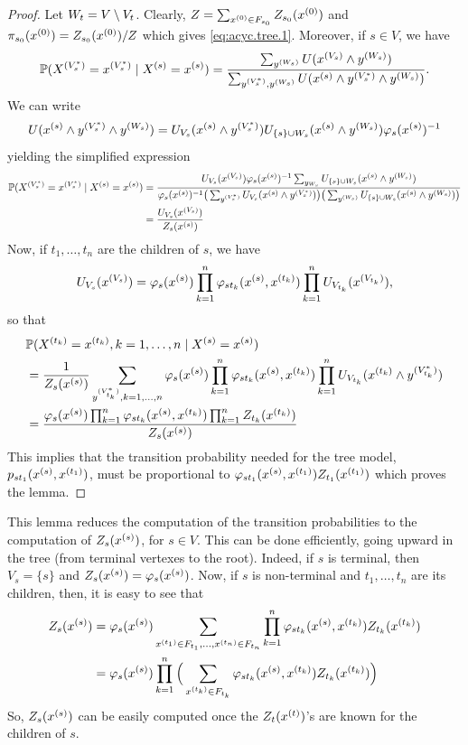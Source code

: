 \begin{proof}
Let  $W_t = V\setminus V_t$. 
Clearly, $Z = \sum_{x^{(0)}\in F_{s_0}} Z_{s_0} (x^{(0)})$
and $\pi_{s_0}(x^{(0)}) = Z_{s_0}(x^{(0)})/Z$ which gives \cref{eq:acyc.tree.1}. Moreover, if $s\in V$, we have
$$
\bm{\mathbb P}(X^{(V_s^*)} = x^{(V_s^*)}\mid X^{(s)}=x^{(s)}) = \frac{\sum_{y^{(W_s)}} U(x^{(V_s)}\wedge
y^{(W_s)})}{\sum_{y^{(V_s^*)}, y^{(W_s)}} U(x^{(s)}\wedge y^{(V_s^*)} \wedge
y^{(W_s)})}.
$$
We can write
$$
U(x^{(s)}\wedge y^{(V_s^*)} \wedge
y^{(W_s)}) = U_{V_s}(x^{(s)}\wedge y^{(V_s^*)}) U_{\{s\}\cup W_s}(x^{(s)}\wedge
y^{(W_s)}) \varphi_s(x^{(s)})^{-1}
$$
yielding the simplified expression
\begin{align*}
\bm{\mathbb P}(X^{(V_s^*)} = x^{(V_s^*)}\mid X^{(s)}=x^{(s)}) &=
 \frac{U_{V_s}(x^{(V_s)})
\varphi_s(x^{(s)})^{-1} \sum_{y_{W_s}} U_{\{s\}\cup W_s}(x^{(s)}\wedge
y^{(W_s)})}{\varphi_s(x^{(s)})^{-1} \big(\sum_{y^{(V_s^*)}} U_{V_s}(x^{(s)}\wedge
y^{(V_s^*)})\big)\big(\sum_{y^{(W_s)}} U_{\{s\}\cup W_s}(x^{(s)}\wedge
y^{(W_s)})\big)
}\\
&= \frac{U_{V_s}(x^{(V_s)})
}{Z_s(x^{(s)}) }
\end{align*}
Now, if $t_1, \ldots, t_n$ are the children of $s$, we have
$$
U_{V_s}(x^{(V_s)}) = \varphi_s(x^{(s)}) \prod_{k=1}^n \varphi_{st_k}(x^{(s)},x^{(t_k)}) \prod_{k=1}^n U_{V_{t_k}}(x^{(V_{t_k})}),
$$
so that
\begin{align*}
&\bm{\mathbb P}(X^{(t_k)} = x^{(t_k)}, k=1, \ldots, n \mid X^{(s)} = x^{(s)}) 
\\ &=
\frac{1}{Z_s(x^{(s)})}\sum_{y^{(V_{t_k}^*)}, k=1, \ldots, n} \varphi_s(x^{(s)})
\prod_{k=1}^n \varphi_{st_k}(x^{(s)}, x^{(t_k)}) \prod_{k=1}^n
U_{V_{t_k}}(x^{(t_k)} \wedge y^{(V^*_{t_k})})\\
&= \frac{\varphi_s(x^{(s)}) \prod_{k=1}^n \varphi_{st_k}(x^{(s)},x^{(t_k)})
\prod_{k=1}^n Z_{t_k}(x^{(t_k)})}{Z_s(x^{(s)})}
\end{align*}
This implies that  the transition
probability needed for the tree model,
$p_{st_1}(x^{(s)}, x^{(t_1)})$, must be
proportional to  
$\varphi_{st_1}(x^{(s)}, x^{(t_1)}) Z_{t_1}(x^{(t_1)})$ which proves the lemma.
\end{proof}

This lemma reduces the computation of the transition probabilities
to the computation of $Z_s(x^{(s)})$, for $s\in V$. This can be done
efficiently, going upward in the tree (from terminal vertexes to the
root). Indeed, if $s$ is terminal, then $V_s  = \{s\}$ and 
$Z_s(x^{(s)}) = \varphi_s(x^{(s)})$. Now, if $s$ is non-terminal and $t_1,
\ldots, t_n$ are its children, then, it is easy to see that
\begin{align}
\nonumber
Z_s(x^{(s)}) &= \varphi_s(x^{(s)}) \sum_{x^{(t_1)}\in F_{t_1}, \ldots, x^{(t_n)}\in
F_{t_n}} \prod_{k=1}^n \varphi_{st_k}(x^{(s)}, x^{(t_k)}) Z_{t_k}(x^{(t_k)}) \\
&= 
\varphi_s(x^{(s)}) \prod_{k=1}^n \Big(\sum_{x^{(t_k)}\in F_{t_k}} \varphi_{st_k}(x^{(s)}, x^{(t_k)}) Z_{t_k}(x^{(t_k)})\Big)
\label{eq:z.induc}
\end{align}
So, $Z_s(x^{(s)})$ can be easily computed once the $Z_t(x^{(t)})$'s are known
for the children of $s$.

